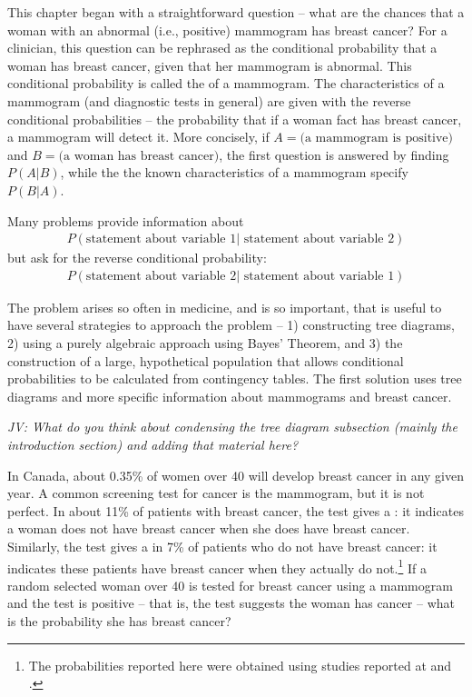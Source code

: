 \begin{doublespace}

This chapter began with a straightforward question -- what are the chances that a woman with an abnormal (i.e., positive) mammogram has breast cancer?  For a clinician, this question can be rephrased as the conditional probability  that a woman has breast cancer, given that her mammogram is abnormal. This conditional probability is called the  of a mammogram.  The characteristics of a mammogram (and diagnostic tests in general) are given with the reverse conditional probabilities --  the probability that if a woman fact has breast cancer, a mammogram will detect it.  More concisely, if $A = \text{(a mammogram is  positive)}$ and $B = \text{(a woman has breast cancer)}$, the first question is answered by finding $P(A|B)$, while the the known characteristics of a mammogram specify $P(B|A)$.

Many problems provide information about  
\begin{align*}
P(\text{statement about variable 1} | \text{ statement about variable 2})
\end{align*}
but ask for the reverse conditional probability:
\begin{align*}
P(\text{statement about variable 2} | \text{ statement about variable 1})
\end{align*}

The problem arises so often in medicine, and is so important, that is useful to have several strategies to approach the problem -- 1) constructing tree diagrams, 2) using a purely algebraic approach using Bayes' Theorem, and 3) the construction of a large, hypothetical population that allows conditional probabilities to be calculated from contingency tables.  The first solution uses tree diagrams and more specific information about mammograms and breast cancer.

\textit{JV: What do you think about condensing the tree diagram subsection (mainly the introduction section) and adding that material here?}

\begin{example}{In Canada, about 0.35\% of women over 40 will develop breast cancer in any given year. A common screening test for cancer is the mammogram, but it is not perfect. In about 11\% of patients with breast cancer, the test gives a : it indicates a woman does not have breast cancer when she does have breast cancer. Similarly, the test gives a  in 7\% of patients who do not have breast cancer: it indicates these patients have breast cancer when they actually do not.\footnote{The probabilities reported here were obtained using studies reported at  and .} If a random selected woman over 40 is tested for breast cancer using a mammogram and the test is positive -- that is, the test suggests the woman has cancer -- what is the probability she has breast cancer?} 


\end{example}
\end{doublespace}
